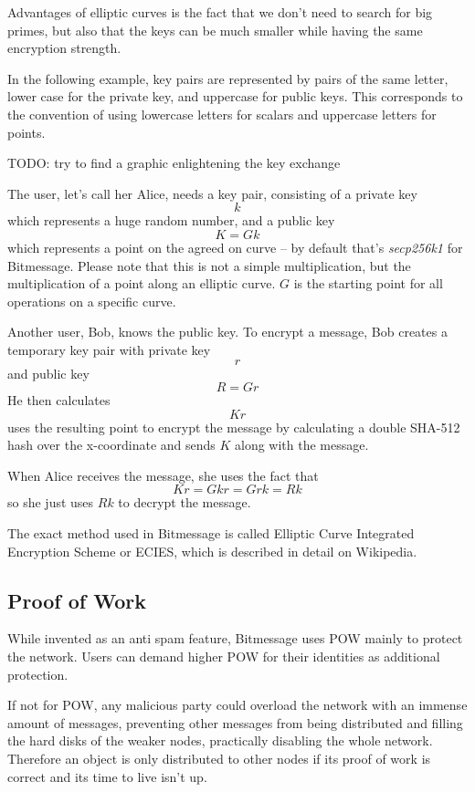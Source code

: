 \documentclass{bfh}
\begin{document}
  Advantages of elliptic curves is the fact that we don't need to search for big primes, but also that the keys can be much smaller while having the same encryption strength.

  In the following example, key pairs are represented by pairs of the same letter, lower case for the private key, and uppercase for public keys. This corresponds to the convention of using lowercase letters for scalars and uppercase letters for points.

TODO: try to find a graphic enlightening the key exchange

  The user, let's call her Alice, needs a key pair, consisting of a private key
$$k$$
which represents a huge random number, and a public key
$$K = G k$$
which represents a point on the agreed on curve -- by default that's \textit{secp256k1} for Bitmessage. Please note that this is not a simple multiplication, but the multiplication of a point along an elliptic curve. $G$ is the starting point for all operations on a specific curve.

  Another user, Bob, knows the public key. To encrypt a message, Bob creates a temporary key pair with private key
$$r$$
and public key
$$R = G r$$
He then calculates
$$K r$$
uses the resulting point to encrypt the message by calculating a double SHA-512 hash over the x-coordinate and sends $K$ along with the message.

  When Alice receives the message, she uses the fact that
$$K r = G k r = G r k = R k$$
so she just uses $R k$ to decrypt the message.

  The exact method used in Bitmessage is called Elliptic Curve Integrated Encryption Scheme or ECIES, which is described in detail on Wikipedia.\cite{wikipedia:ECC}\cite{wikipedia:ECIES}

  \subsection{Proof of Work}
  \label{subsec:pow}
  While invented as an anti spam feature, Bitmessage uses \acf{POW} mainly to protect the network. Users can demand higher \ac{POW} for their identities as additional protection.

  If not for \ac{POW}, any malicious party could overload the network with an immense amount of messages, preventing other messages from being distributed and filling the hard disks of the weaker nodes, practically disabling the whole network. Therefore an object is only distributed to other nodes if its proof of work is correct and its time to live isn't up.
\end{document}
